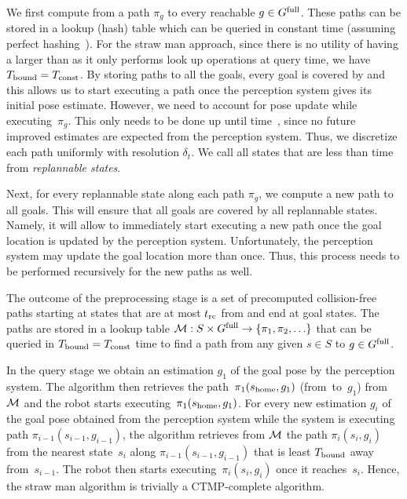 \documentclass[a4paper]{report}
\begin{document}
We first compute from \Shome a path $\pi_g$ to every reachable $g \in G^{\textrm{full}}$. 
These paths can be stored in a lookup (hash) table which can be queried in constant time \Tconst (assuming perfect hashing~\cite{czech1997perfect}).
For the straw man approach, since there is no utility of having a \Tbound larger than \Tconst as it only performs look up operations at query time, we have $T_{\textrm{bound}} = T_{\textrm{const}}$.
By storing paths to all the goals, every goal is covered by \Shome and this allows us to start executing a path once the perception system gives its initial pose estimate.
However, we need to account for pose update while executing~$\pi_g$. 
%
This only needs to be done up until time~\Trc, since no future improved estimates are expected from the perception system.
Thus, we discretize each path uniformly with resolution $\delta_t$.
%
We call all states that are less than \Trc time from \Shome \emph{replannable states}.


Next, for every replannable state along each path $\pi_g$, we compute a new path to all goals. 
%
This will ensure that all goals are covered by all replannable states. Namely, it will allow to immediately start executing a new path once the goal location is updated by the perception system.
%
Unfortunately, the perception system may update the goal location more than once. Thus, this process needs to be performed recursively for the new paths as well.


The outcome of the preprocessing stage is a set of precomputed collision-free paths starting at states that are at most $t_{\textrm{rc}}$ from \Shome and end at goal states.
The paths are stored in a lookup table $\mathcal{M}: S \times G^{\textrm{full}} \rightarrow \{ \pi_1, \pi_2, \ldots \}$ that can be queried in $T_{\textrm{bound}}=T_{\textrm{const}}$ time to find a path from any given $s \in S$ to $g \in G^{\textrm{full}}$.


In the query stage we obtain an estimation $g_1$ of the goal pose by the perception system. 
The algorithm then retrieves the path~$\pi_1(s_{\textrm{home}},g_1)$ (from~\Shome to~$g_1$) from $\mathcal{M}$ and the robot starts executing~$\pi_1(s_{\textrm{home}},g_1)$.
%
For every new estimation $g_i$ of the goal pose obtained from the perception system while the system is executing path $\pi_{i-1}(s_{i-1},g_{i-1})$, the algorithm retrieves from $\mathcal{M}$ the path $\pi_i(s_i,g_i)$ from the nearest state~$s_i$ along $\pi_{i-1}(s_{i-1},g_{i-1})$ that is least $T_{\textrm{bound}}$ away from~$s_{i-1}$. The robot then starts executing~$\pi_i(s_i,g_i)$ once it reaches~$s_i$.
Hence, the straw man algorithm is trivially a CTMP-complete algorithm.
\end{document}
